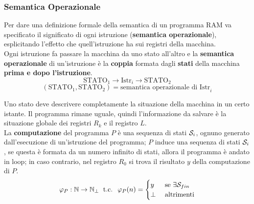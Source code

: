 \subsubsection{Semantica Operazionale}

Per dare una definizione formale della semantica di un programma RAM va specificato il significato di ogni istruzione (\textbf{semantica operazionale}), esplicitando l'effetto che quell'istruzione ha sui registri della macchina.\\

Ogni istruzione fa passare la macchina da uno stato all'altro e la \textbf{semantica operazionale} di un'istruzione è la \textbf{coppia} formata dagli \textbf{stati} della macchina \textbf{prima e dopo l'istruzione}.
$$ \text{STATO}_1 \rightarrow \boxed{\text{Istr}_i} \rightarrow \text{STATO}_2 $$
$$ (\text{STATO}_1,\text{STATO}_2) = \text{semantica operazionale di Istr}_i $$

Uno stato deve descrivere completamente la situazione della macchina in un certo istante. Il programma rimane uguale, quindi l'informazione da salvare è la situazione globale dei registri $R_k$ e il registro $L$.\\

La \textbf{computazione} del programma $P$ è una sequenza di stati $\mathcal{S}_i$, ognuno generato dall'esecuzione di un'istruzione del programma; $P$ induce una sequenza di stati $\mathcal{S}_i$, se questa è formata da un numero infinito di stati, allora il programma è andato in loop; in caso contrario, nel registro $R_0$ si trova il risultato $y$ della computazione di $P$.
$$ 
\varphi_P: \mathbb{N} \rightarrow \mathbb{N}_\bot \; \text{ t.c. } \; \varphi_P(n) = \begin{cases}
	y & \text{ se } \exists \mathcal{S}_{fin} \\
	\bot & \text{ altrimenti}
\end{cases}
$$


